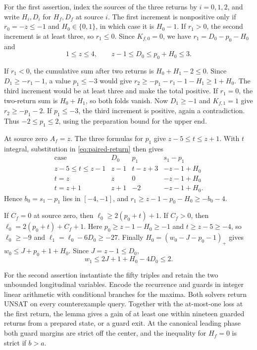 \documentclass[11pt,reqno]{amsart}
\theoremstyle{remark}
\begin{document}
For the first assertion, index the sources of the three returns by
\(i=0,1,2\), and write \(H_i,D_i\) for \(H_f,D_f\) at source \(i\).
The first increment is nonpositive only if \(r_0=-z\le-1\) and
\(H_0\in\{0,1\}\), in which case it is \(H_0-1\). If \(r_1>0\),
the second increment is at least three, so \(r_1\le0\). Since
\(K_{f,0}=0\), we have \(r_1=D_0-p_0-H_0\) and
\[
 1\le z\le4,\qquad z-1\le D_0\le p_0+H_0\le3 .
\]

If \(r_1<0\), the cumulative sum after two returns is
\(H_0+H_1-2\le0\). Since \(D_1\ge-r_1-1\), a value \(p_1\le-3\)
would give \(r_2\ge-p_1-r_1-1-H_1\ge1+H_0\). The third increment
would be at least three and make the total positive. If \(r_1=0\),
the two-return sum is \(H_0+H_1\), so both folds vanish. Now
\(D_1\ge-1\) and \(K_{f,1}=1\) give \(r_2\ge-p_1-2\). If
\(p_1\le-3\), the third increment is positive, again a contradiction.
Thus \(-2\le p_1\le2\), using the preparation bound for the upper end.

At source zero \(A_f=z\). The three formulas for \(p_1\) give
\(z-5\le t\le z+1\). With \(t\) integral, substitution in
\eqref{eq:paired-return} then gives
\[
\begin{array}{c|ccc}
\text{case} & D_0 & p_1 & s_1-p_1\\ \hline
z-5\le t\le z-1 & z-1 & t-z+3 & -z-1+H_0\\
t=z             & z   & 0     & -z-1+H_0\\
t=z+1           & z+1 & -2    & -z-1+H_0 .
\end{array}
\]
Hence \(b_0=s_1-p_1\) lies in \([-4,-1]\), and
\(r_1\ge z-1-p_0-H_0\ge -b_0-4\).

If \(C_f=0\) at source zero, then \(\ell_0\ge2(p_0+t)+1\).
If \(C_f>0\), then \(\ell_0=2(p_0+t)+C_f+1\).
Here \(p_0\ge z-1-H_0\ge-1\) and \(t\ge z-5\ge-4\), so
\(\ell_0\ge-9\) and \(\ell_1=\ell_0-6D_0\ge-27\).
Finally \(H_0=(w_0-J-p_0-1)_+\) gives
\(w_0\le J+p_0+1+H_0\). Since \(J=z-1\le D_0\),
\[
 w_1\le 2J+1+H_0-4D_0\le2 .
\]

For the second assertion instantiate the fifty triples and retain the two unbounded longitudinal variables. Encode the recurrence and guards in integer linear arithmetic with conditional branches for the maxima. Both solvers return UNSAT on every counterexample query. Together with the at-most-one loss at the first return, the lemma gives a gain of at least one within nineteen guarded returns from a prepared state, or a guard exit. At the canonical leading phase both guard margins are strict off the center, and the inequality for \(H_f=0\) is strict if \(b>a\).
\end{document}
